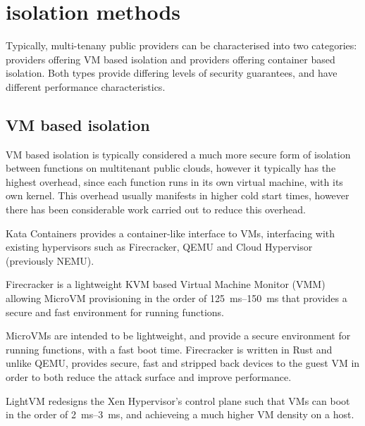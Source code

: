 \section{\faas{} isolation methods}
Typically, multi-tenany public \faas{} providers can be characterised into two categories: providers offering VM based isolation\cite{agacheFirecrackerLightweightVirtualization2020} and providers offering container based isolation\cite{GVisor}. Both types provide differing levels of security guarantees, and have different performance characteristics.

\subsection{VM based isolation}
VM based isolation is typically considered a much more secure form of isolation between \faas{} functions on multitenant public clouds\cite{jithinVirtualMachineIsolation2014}, however it typically has the highest overhead, since each function runs in its own virtual machine, with its own kernel. This overhead usually manifests in higher cold start times, however there has been considerable work carried out to reduce this overhead\cite{razaviPrebakedUVMsScalable2015,agacheFirecrackerLightweightVirtualization2020,dawXanaduMitigatingCascading2020,oliverstenbomRefunctionEliminatingServerless2019}.

Kata Containers\cite{KataContainersOpen} provides a container-like interface to VMs, interfacing with existing hypervisors such as Firecracker\cite{agacheFirecrackerLightweightVirtualization2020}, QEMU\cite{QEMU} and Cloud Hypervisor\cite{CloudhypervisorCloudhypervisorVirtual} (previously NEMU\cite{IntelNemu2024}).

Firecracker \cite{agacheFirecrackerLightweightVirtualization2020} is a lightweight KVM\cite{KVM} based Virtual Machine Monitor (VMM) allowing MicroVM provisioning in the order of \qtyrange{125}{150}{\ms} that provides a secure and fast environment for running \faas{} functions.

MicroVMs are intended to be lightweight, and provide a secure environment for running functions, with a fast boot time. Firecracker is written in Rust and unlike QEMU, provides secure, fast and stripped back devices to the guest VM in order to both reduce the attack surface and improve performance\cite{jainStudyFirecrackerMicroVM2020}.

LightVM redesigns the Xen Hypervisor's control plane such that VMs can boot in the order of \qtyrange{2}{3}{\ms}\cite{mancoMyVMLighter2017}, and achieveing a much higher VM density on a host.


